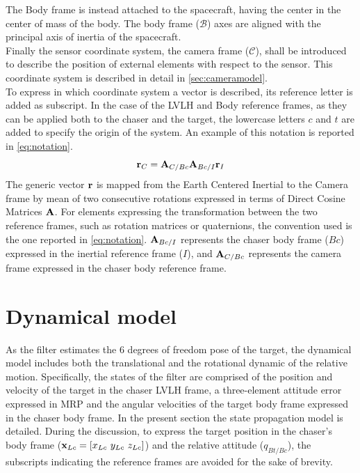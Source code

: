 The Body frame is instead attached to the spacecraft, having the center in the center of mass of the body. The body frame ($\mathcal{B}$) axes are aligned with the principal axis of inertia of the spacecraft. \\
Finally the sensor coordinate system, the camera frame ($\mathcal{C}$), shall be introduced to describe the position of external elements with respect to the sensor. This coordinate system is described in detail in \cref{sec:cameramodel}.\\
To express in which coordinate system a vector is described, its reference letter is added as subscript. In the case of the LVLH and Body reference frames, as they can be applied both to the chaser and the target, the lowercase letters $c$ and $t$ are added to specify the origin of the system. An example of this notation is reported in \cref{eq:notation}.
\begin{equation}
\label{eq:notation}
    \mathrm{\textbf{r}}_C = \mathrm{\textbf{A}}_{C/Bc} \mathrm{\textbf{A}}_{Bc/I} \mathrm{\textbf{r}}_I
\end{equation}
The generic vector $\mathrm{\textbf{r}}$ is mapped from the Earth Centered Inertial to the Camera frame by mean of two consecutive rotations expressed in terms of Direct Cosine Matrices $\mathrm{\textbf{A}}$. For elements expressing the transformation between the two reference frames, such as rotation matrices or quaternions, the convention used is the one reported in \cref{eq:notation}. $\mathrm{\textbf{A}}_{Bc/I}$ represents the chaser body frame ($Bc$) expressed in the inertial reference frame ($I$), and $\mathrm{\textbf{A}}_{C/Bc}$ represents the camera frame expressed in the chaser body reference frame.

\section{Dynamical model}
As the filter estimates the 6 degrees of freedom pose of the target, the dynamical model includes both the translational and the rotational dynamic of the relative motion. 
Specifically, the states of the filter are comprised of the position and velocity of the target in the chaser LVLH frame, a three-element attitude error expressed in MRP and the angular velocities of the target body frame expressed in the chaser body frame. 
In the present section the state propagation model is detailed. During the discussion, to express the target position in the chaser's body frame ($\mathrm{\textbf{x}}_{Lc} = [x_{Lc} \ y_{Lc} \ z_{Lc}]$) and the relative attitude ($q_{Bt/Bc}$), the subscripts indicating the reference frames are avoided for the sake of brevity.
